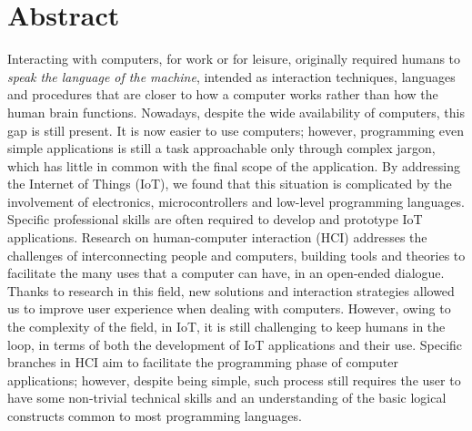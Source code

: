 \chapter{Abstract}

Interacting with computers, for work or for leisure, originally required humans to \textit{speak the language of the machine}, intended as interaction techniques, languages and procedures that are closer to how a computer works rather than how the human brain functions. Nowadays, despite the wide availability of computers, this gap is still present. It is now easier to use computers; however, programming even simple applications is still a task approachable only through complex jargon, which has little in common with the final scope of the application.
By addressing the Internet of Things (IoT), we found that this situation is complicated by the involvement of electronics, microcontrollers and low-level programming languages. Specific professional skills are often required to develop and prototype IoT applications.
Research on human-computer interaction (HCI) addresses the challenges of interconnecting people and computers, building tools and theories to facilitate the many uses that a computer can have, in an open-ended dialogue. Thanks to research in this field, new solutions and interaction strategies allowed us to improve user experience when dealing with computers. However, owing to the complexity of the field, in IoT, it is still challenging to keep humans in the loop, in terms of both the development of IoT applications and their use. Specific branches in HCI aim to facilitate the programming phase of computer applications; however, despite being simple, such process still requires the user to have some non-trivial technical skills and an understanding of the basic logical constructs common to most programming languages.


